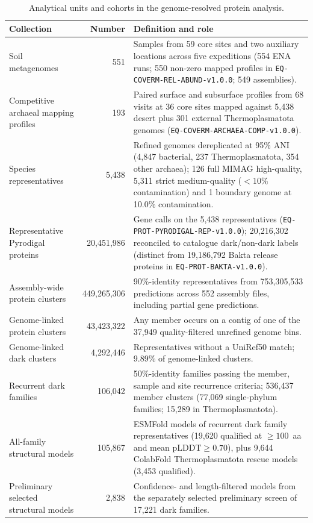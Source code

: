\begin{table}[ht]\centering\small
\caption{Analytical units and cohorts in the genome-resolved protein analysis.}\label{tab:cohorts}
\begin{tabular}{@{}p{}rp{}@{}}
\toprule
Collection & Number & Definition and role\\
\midrule
Soil metagenomes & 551 & Samples from 59 core sites and two auxiliary locations across five expeditions (554 ENA runs; 550 non-zero mapped profiles in \texttt{EQ-COVERM-REL-ABUND-v1.0.0}; 549 assemblies).\\
Competitive archaeal mapping profiles & 193 & Paired surface and subsurface profiles from 68 visits at 36 core sites mapped against 5,438 desert plus 301 external Thermoplasmatota genomes (\texttt{EQ-COVERM-ARCHAEA-COMP-v1.0.0}).\\
Species representatives & 5,438 & Refined genomes dereplicated at 95\% ANI (4,847 bacterial, 237 Thermoplasmatota, 354 other archaea); 126 full MIMAG high-quality, 5,311 strict medium-quality ($<10\%$ contamination) and 1 boundary genome at 10.0\% contamination.\\
Representative Pyrodigal proteins & 20,451,986 & Gene calls on the 5,438 representatives (\texttt{EQ-PROT-PYRODIGAL-REP-v1.0.0}); 20,216,302 reconciled to catalogue dark/non-dark labels (distinct from 19,186,792 Bakta release proteins in \texttt{EQ-PROT-BAKTA-v1.0.0}).\\
Assembly-wide protein clusters & 449,265,306 & 90\%-identity representatives from 753,305,533 predictions across 552 assembly files, including partial gene predictions.\\
Genome-linked protein clusters & 43,423,322 & Any member occurs on a contig of one of the 37,949 quality-filtered unrefined genome bins.\\
Genome-linked dark clusters & 4,292,446 & Representatives without a UniRef50 match; 9.89\% of genome-linked clusters.\\
Recurrent dark families & 106,042 & 50\%-identity families passing the member, sample and site recurrence criteria; 536,437 member clusters (77,069 single-phylum families; 15,289 in Thermoplasmatota).\\
All-family structural models & 105,867 & ESMFold models of recurrent dark family representatives (19,620 qualified at $\geq 100$~aa and mean $\mathrm{pLDDT}\geq 0.70$), plus 9,644 ColabFold Thermoplasmatota rescue models (3,453 qualified).\\
Preliminary selected structural models & 2,838 & Confidence- and length-filtered models from the separately selected preliminary screen of 17,221 dark families.\\
\bottomrule
\end{tabular}
\end{table}

